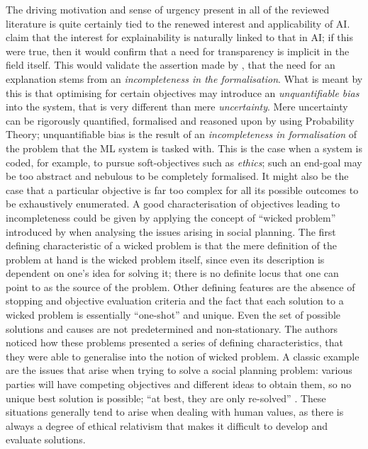 The driving motivation and sense of urgency present in all of the reviewed literature is quite certainly tied to the renewed interest and applicability of AI.
\citet{Preece2018} claim that the interest for explainability is naturally linked to that in AI; if this were true, then it would confirm that a need for transparency is implicit in the field itself.
This would validate the assertion made by \citet{doshi2017towards}, that the need for an explanation stems from an \textit{incompleteness in the formalisation}.
What is meant by this is that optimising for certain objectives may introduce an \textit{unquantifiable bias} into the system, that is very different than mere \textit{uncertainty}.
Mere uncertainty can be rigorously quantified, formalised and reasoned upon by using Probability Theory; unquantifiable bias is the result of an \textit{incompleteness in formalisation} of the problem that the ML system is tasked with.
This is the case when a system is coded, for example, to pursue soft-objectives such as \textit{ethics}; such an end-goal may be too abstract and nebulous to be completely formalised.
It might also be the case that a particular objective is far too complex for all its possible outcomes to be exhaustively enumerated.
A good characterisation of objectives leading to incompleteness could be given by applying the concept of \enquote{wicked problem} introduced by \citet{Rittel1973} when analysing the issues arising in social planning.
The first defining characteristic of a wicked problem is that the mere definition of the problem at hand is the wicked problem itself, since even its description is dependent on one's idea for solving it; there is no definite locus that one can point to as the source of the problem. 
Other defining features are the absence of stopping and objective evaluation criteria and the fact that each solution to a wicked problem is essentially \enquote{one-shot} and unique.  
Even the set of possible solutions and causes are not predetermined and non-stationary. 
The authors noticed how these problems presented a series of defining characteristics, that they were able to generalise into the notion of wicked problem.
A classic example are the issues that arise when trying to solve a social planning problem: various parties will have competing objectives and different ideas to obtain them, so no unique best solution is possible; \enquote{at best, they are only re-solved} \citep{Rittel1973}. 
These situations generally tend to arise when dealing with human values, as there is always a degree of ethical relativism that makes it difficult to develop and evaluate solutions.  
